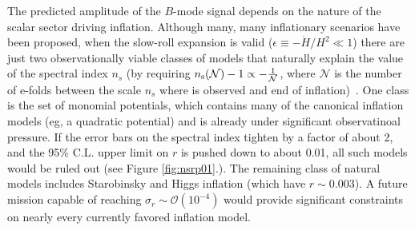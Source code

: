 
The predicted amplitude of the $B$-mode signal depends on the nature of the scalar sector driving inflation. Although many, many inflationary scenarios have been proposed, when the slow-roll expansion is valid ($\epsilon\equiv-\dot{H}/H^2\ll1$) there are just two observationally viable classes of models that naturally explain the value of the spectral index $n_s$ (by requiring $n_{\rm s}(\mathcal{N})-1\propto-\frac{1}{\mathcal{N}}$, where $\mathcal{N}$ is the number of e-folds between the scale $n_s$ where is observed and end of inflation)~\cite{Mukhanov:2013tua,Roest:2013fha,Creminelli:2014nqa}. One class is the set of monomial potentials, which contains many of the canonical inflation models (eg, a quadratic potential) and is already under significant observatinoal pressure. If the error bars on the spectral index tighten by a factor of about 2, and the 95\% C.L. upper limit on $r$ is pushed down to about 0.01, all such models would be ruled out (see Figure \ref{fig:nsrp01}.). The remaining class of natural models includes Starobinsky and Higgs inflation (which have $r\sim0.003$). A future mission capable of reaching $\sigma_r\sim\mathcal{O}(10^{-4})$ would provide significant constraints on nearly every currently favored inflation model.
